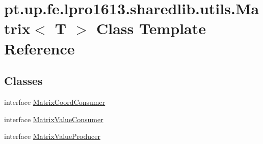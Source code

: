 \hypertarget{classpt_1_1up_1_1fe_1_1lpro1613_1_1sharedlib_1_1utils_1_1_matrix}{}\section{pt.\+up.\+fe.\+lpro1613.\+sharedlib.\+utils.\+Matrix$<$ T $>$ Class Template Reference}
\label{classpt_1_1up_1_1fe_1_1lpro1613_1_1sharedlib_1_1utils_1_1_matrix}
\subsection*{Classes}
\begin{DoxyCompactItemize}
\item 
interface \hyperlink{interfacept_1_1up_1_1fe_1_1lpro1613_1_1sharedlib_1_1utils_1_1_matrix_1_1_matrix_coord_consumer}{Matrix\+Coord\+Consumer}
\item 
interface \hyperlink{interfacept_1_1up_1_1fe_1_1lpro1613_1_1sharedlib_1_1utils_1_1_matrix_1_1_matrix_value_consumer}{Matrix\+Value\+Consumer}
\item 
interface \hyperlink{interfacept_1_1up_1_1fe_1_1lpro1613_1_1sharedlib_1_1utils_1_1_matrix_1_1_matrix_value_producer}{Matrix\+Value\+Producer}
\end{DoxyCompactItemize}
